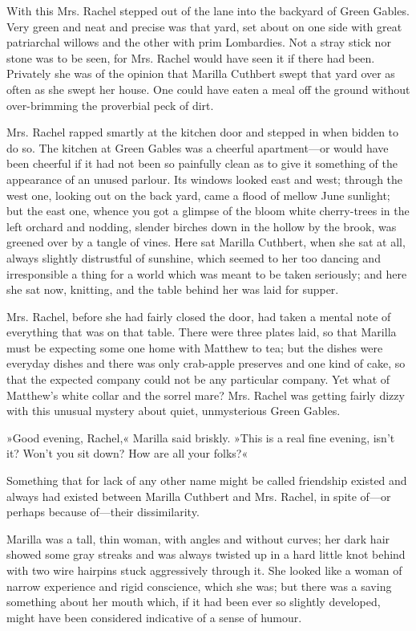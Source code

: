 With this Mrs. Rachel stepped out of the lane into the backyard of Green Gables. Very green and neat and precise was that yard, set about on one side with great patriarchal willows and the other with prim Lombardies. Not a stray stick nor stone was to be seen, for Mrs. Rachel would have seen it if there had been. Privately she was of the opinion that Marilla Cuthbert swept that yard over as often as she swept her house. One could have eaten a meal off the ground without over-brimming the proverbial peck of dirt.

Mrs. Rachel rapped smartly at the kitchen door and stepped in when bidden to do so. The kitchen at Green Gables was a cheerful apartment—or would have been cheerful if it had not been so painfully clean as to give it something of the appearance of an unused parlour. Its windows looked east and west; through the west one, looking out on the back yard, came a flood of mellow June sunlight; but the east one, whence you got a glimpse of the bloom white cherry-trees in the left orchard and nodding, slender birches down in the hollow by the brook, was greened over by a tangle of vines. Here sat Marilla Cuthbert, when she sat at all, always slightly distrustful of sunshine, which seemed to her too dancing and irresponsible a thing for a world which was meant to be taken seriously; and here she sat now, knitting, and the table behind her was laid for supper.

Mrs. Rachel, before she had fairly closed the door, had taken a mental note of everything that was on that table. There were three plates laid, so that Marilla must be expecting some one home with Matthew to tea; but the dishes were everyday dishes and there was only crab-apple preserves and one kind of cake, so that the expected company could not be any particular company. Yet what of Matthew's white collar and the sorrel mare? Mrs. Rachel was getting fairly dizzy with this unusual mystery about quiet, unmysterious Green Gables.

»Good evening, Rachel,« Marilla said briskly. »This is a real fine evening, isn't it? Won't you sit down? How are all your folks?«

Something that for lack of any other name might be called friendship existed and always had existed between Marilla Cuthbert and Mrs. Rachel, in spite of—or perhaps because of—their dissimilarity.

Marilla was a tall, thin woman, with angles and without curves; her dark hair showed some gray streaks and was always twisted up in a hard little knot behind with two wire hairpins stuck aggressively through it. She looked like a woman of narrow experience and rigid conscience, which she was; but there was a saving something about her mouth which, if it had been ever so slightly developed, might have been considered indicative of a sense of humour.

